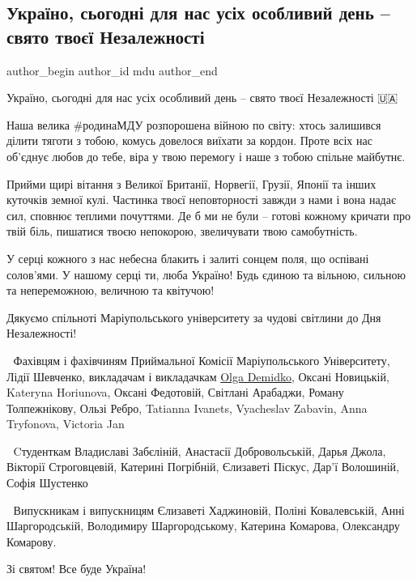  
 
 
 
 

\subsection{Україно, сьогодні для нас усіх особливий день – свято твоєї Незалежності}
\label{sec:24_08_2023.fb.mdu.1.ukraino_osobl_den_svjato_tvojeji_nezalezhnosti}

\ifcmt
 author_begin
   author_id mdu
 author_end
\fi

Україно, сьогодні для нас усіх особливий день – свято твоєї Незалежності 🇺🇦

Наша велика \#родинаМДУ розпорошена війною по світу: хтось залишився ділити
тяготи з тобою, комусь довелося виїхати за кордон. Проте всіх нас об'єднує
любов до тебе, віра у твою перемогу і наше з тобою спільне майбутнє. 

Прийми щирі вітання з Великої Британії, Норвегії, Грузії, Японії та інших
куточків земної кулі. Частинка твоєї неповторності завжди з нами і вона надає
сил, сповнює теплими почуттями. Де б ми не були – готові кожному кричати про
твій біль, пишатися твоєю непокорою, звеличувати твою самобутність.

У серці кожного з нас небесна блакить і залиті сонцем поля, що оспівані
солов'ями. У нашому серці ти, люба Україно! Будь єдиною та вільною, сильною та
непереможною, величною та квітучою!

Дякуємо спільноті Маріупольського університету за чудові світлини до Дня
Незалежності!

💙 Фахівцям і фахівчиням Приймальної Комісії Маріупольського Університету, Лідії
Шевченко, викладачам і викладачкам \href{\urlDemidkoIA}{Olga Demidko}, Оксані Новицькій, Kateryna
Horiunova, Оксані Федотовій, Світлані Арабаджи, Роману Толпежнікову, Ользі
Ребро, Tatianna Ivanets, Vyacheslav Zabavin, Anna Tryfonova, Victoria Jan 

💛 Cтуденткам Владиславі Забєліній, Анастасії Добровольській, Дарья Джола,
Вікторії Строговцевій, Катерині Погрібній, Єлизаветі Піскус, Дар'ї Волошиній,
Софія Шустенко

🧡 Випускникам і випускницям Єлизаветі Хаджиновій, Поліні Ковалевській, Анні
Шаргородській, Володимиру Шаргородському, Катерина Комарова, Олександру
Комарову.

Зі святом! Все буде Україна! 🌻

